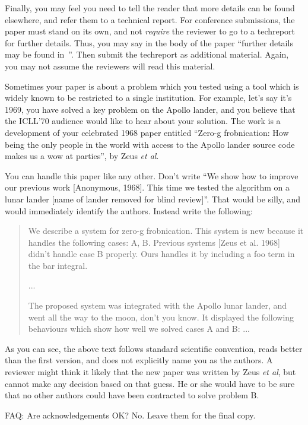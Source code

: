 \documentclass{bmvc2k}
\def\etal{\emph{et al}\bmvaOneDot}
\begin{document}
Finally, you may feel you need to tell the reader that more details can be
found elsewhere, and refer them to a technical report.  For conference
submissions, the paper must stand on its own, and not {\em require} the
reviewer to go to a techreport for further details.  Thus, you may say in
the body of the paper ``further details may be found
in~\cite{Authors06b}''.  Then submit the techreport as additional material.
Again, you may not assume the reviewers will read this material.

Sometimes your paper is about a problem which you tested using a tool which
is widely known to be restricted to a single institution.  For example,
let's say it's 1969, you have solved a key problem on the Apollo lander,
and you believe that the ICLL'70 audience would like to hear about your
solution.  The work is a development of your celebrated 1968 paper entitled
``Zero-g frobnication: How being the only people in the world with access to
the Apollo lander source code makes us a wow at parties'', by Zeus \etal.

You can handle this paper like any other.  Don't write ``We show how to
improve our previous work [Anonymous, 1968].  This time we tested the
algorithm on a lunar lander [name of lander removed for blind review]''.
That would be silly, and would immediately identify the authors. Instead
write the following:
\begin{quotation}
\noindent
   We describe a system for zero-g frobnication.  This
   system is new because it handles the following cases:
   A, B.  Previous systems [Zeus et al. 1968] didn't
   handle case B properly.  Ours handles it by including
   a foo term in the bar integral.

   ...

   The proposed system was integrated with the Apollo
   lunar lander, and went all the way to the moon, don't
   you know.  It displayed the following behaviours
   which show how well we solved cases A and B: ...
\end{quotation}
As you can see, the above text follows standard scientific convention,
reads better than the first version, and does not explicitly name you as
the authors.  A reviewer might think it likely that the new paper was
written by Zeus \etal, but cannot make any decision based on that guess.
He or she would have to be sure that no other authors could have been
contracted to solve problem B.

FAQ: Are acknowledgements OK?  No.  Leave them for the final copy.
\end{document}
